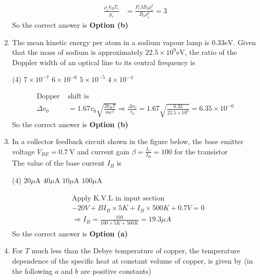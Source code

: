 \begin{enumerate}
\begin{answer}
\begin{align*}
	\frac{\rho_{c} k_{B} T_{c}}{p_{c}}&=\frac{P_{c} 3 B_{3} \rho_{c}^{2}}{B_{3} \rho_{c}^{3}}=3
	\end{align*}
		So the correct answer is \textbf{Option (b)}
\end{answer}
\item The mean kinetic energy per atom in a sodium vapour lamp is $0.33 \mathrm{eV}$. Given that the mass of sodium is approximately $22.5 \times 10^{9} \mathrm{eV}$, the ratio of the Doppler width of an optical line to its central frequency is
 \begin{tasks}(4)
	\task[\textbf{a.}]$7 \times 10^{-7}$
	\task[\textbf{b.}]$6 \times 10^{-6}$
	\task[\textbf{c.}]$5 \times 10^{-5}$
	\task[\textbf{d.}]$4 \times 10^{-4}$ 
\end{tasks}
\begin{answer}
	\begin{align*}
	\text{Dopper }&\text{shift is}\\
	\Delta v_{0}&=1.67 v_{0} \sqrt{\frac{2 k_{B} T}{m c^{2}}} \Rightarrow \frac{\Delta v_{0}}{v_{0}}=1.67 \sqrt{\frac{0.33}{22.5 \times 10^{9}}}=6.35 \times 10^{-6}
	\end{align*}
	So the correct answer is \textbf{Option (b)}
\end{answer}
\item  In a collector feedback circuit shown in the figure below, the base emitter voltage $V_{B E}=0.7 \mathrm{~V}$ and current gain $\beta=\frac{I_{C}}{I_{B}}=100$ for the transistor\\
The value of the base current $I_{B}$ is
 \begin{tasks}(4)
	\task[\textbf{a.}]$20 \mu \mathrm{A}$
	\task[\textbf{b.}]$40 \mu \mathrm{A}$
	\task[\textbf{c.}]$10 \mu \mathrm{A}$
	\task[\textbf{d.}]$100 \mu \mathrm{A}$ 
\end{tasks}
\begin{answer}
	\begin{align*}
	\begin{aligned}
	&\text{Apply K.V.L in input section}\\
	&-20 V+B I_{B} \times 5 K+I_{B} \times 500 K+0.7 V=0 \\
	&\Rightarrow I_{B}=\frac{193}{100 \times 5 K+500 K}=19.3 \mu A
	\end{aligned}
	\end{align*}
		So the correct answer is \textbf{Option (a)}
\end{answer}
\item For $T$ much less than the Debye temperature of copper, the temperature dependence of the specific heat at constant volume of copper, is given by (in the following $a$ and $b$ are positive constants)

\end{enumerate}
